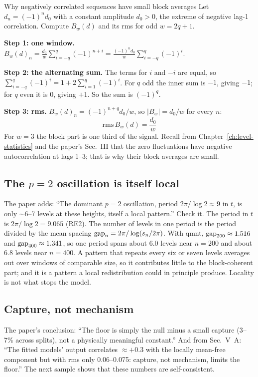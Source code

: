 \begin{sample}{Why negatively correlated sequences have small block averages}
Let $d_n=(-1)^nd_0$ with a constant amplitude $d_0>0$, the extreme of negative lag-1 correlation. Compute $B_w(d)$ and its rms for odd $w=2q+1$.

\textbf{Step 1: one window.} $B_w(d)_n=\frac{d_0}{w}\sum_{i=-q}^{q}(-1)^{n+i}=\frac{(-1)^nd_0}{w}\sum_{i=-q}^{q}(-1)^i$.

\textbf{Step 2: the alternating sum.} The terms for $i$ and $-i$ are equal, so $\sum_{i=-q}^{q}(-1)^i=1+2\sum_{i=1}^{q}(-1)^i$. For $q$ odd the inner sum is $-1$, giving $-1$; for $q$ even it is $0$, giving $+1$. So the sum is $(-1)^q$.

\textbf{Step 3: rms.} $B_w(d)_n=(-1)^{n+q}d_0/w$, so $|B_w|=d_0/w$ for every $n$:
\[
\boxed{\mathrm{rms}\,B_w(d)=\frac{d_0}{w}}
\]
For $w=3$ the block part is one third of the signal. Recall from Chapter~\ref{ch:level-statistics} and the paper's Sec.~III that the zero fluctuations have negative autocorrelation at lags 1--3; that is why their block averages are small.
\end{sample}

\subsection{The $p=2$ oscillation is itself local}

The paper adds: ``The dominant $p=2$ oscillation, period $2\pi/\log2\approx9$ in $t$, is only $\sim$6--7 levels at these heights, itself a local pattern.'' Check it. The period in $t$ is $2\pi/\log2=9.065$ (RE2). The number of levels in one period is the period divided by the mean spacing $\mathrm{gap}_n=2\pi/\log(s_n/2\pi)$. With qmnt, $\mathrm{gap}_{200}\approx1.516$ and $\mathrm{gap}_{400}\approx1.341$, so one period spans about 6.0 levels near $n=200$ and about 6.8 levels near $n=400$. A pattern that repeats every six or seven levels averages out over windows of comparable size, so it contributes little to the block-coherent part; and it is a pattern a local redistribution could in principle produce. Locality is not what stops the model.

\subsection{Capture, not mechanism}

The paper's conclusion: ``The floor is simply the null minus a small capture (3--7\% across splits), not a physically meaningful constant.'' And from Sec.~V~A: ``The fitted models' output correlates $\approx+0.3$ with the locally mean-free component but with rms only 0.06--0.075: capture, not mechanism, limits the floor.'' The next sample shows that these numbers are self-consistent.

